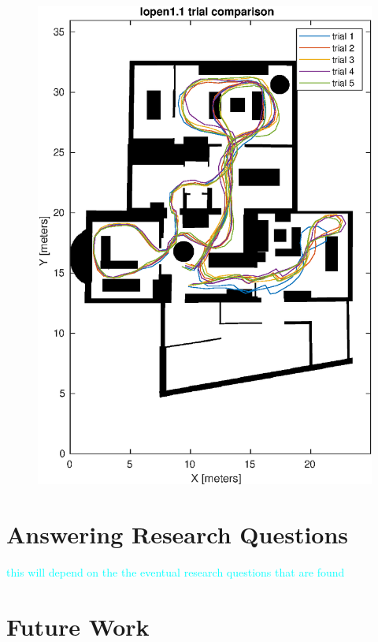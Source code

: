 \begin{figure}[H]
	\centering
	\begin{minipage}{.45\textwidth}
		\centering
		\includegraphics[width=\linewidth]{images/20201107_1142_trial_comparison_1}
		\caption{}
		\label{fig:202011071142trialcomparison1}
	\end{minipage}
\end{figure}

\section{Answering Research Questions}

\textcolor{cyan}{this will depend on the the eventual research questions that are found}

\section{Future Work}

